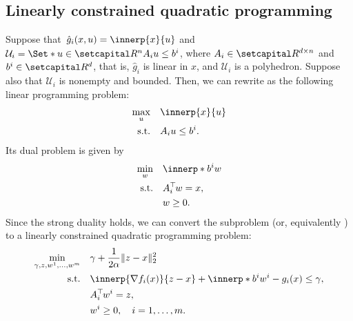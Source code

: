 \documentclass[../../main]{subfiles}
\begin{document}
\subsection{Linearly constrained quadratic programming} 
Suppose that~$\hat{g}_i (x,u) = \innerp{x}{u}$ and ${\mathcal{U}}_i = \Set*{ u \in \setR^n }{ A_i u \le b^i }$, where $A_i \in \setR^{d \times n}$ and $b^i \in \setR^d$, that is, $\hat{g}_i$ is linear in $x$, and $\mathcal{U}_i$ is a polyhedron. Suppose also that $\mathcal{U}_i$ is nonempty and bounded.
Then, we can rewrite  as the following linear programming problem:
\begin{align}\label{eq:lp}
\begin{aligned}
\max_u \quad   & \innerp{x}{u} \\ 
\st    \quad   & A_i u \le b^i.
\end{aligned}
\end{align}
Its dual problem is given by
\begin{align}
\begin{aligned}
\min_w \quad   & \innerp*{b^i}{w} \\ 
\st    \quad   & A_i^\T w = x, \\
&w \geq 0.
\end{aligned}
\end{align}
Since the strong duality holds, we can convert the subproblem  (or, equivalently ) to a linearly constrained quadratic programming problem:
\begin{align}\label{eq:qp}
\begin{aligned}
\min_{\gamma, z, w^1, \dots, w^m} \quad   &\gamma + \frac{1}{2 \alpha}\norm{z - x}_2^2  \\ 
\st    \quad   &\innerp{\nabla f_i(x)}{z - x} + \innerp*{b^i}{w^i} - g_i(x) \le \gamma, \\
& A_i^\T w^i = z, \\
&w^i \geq 0, \quad i = 1,\dots,m.
\end{aligned}
\end{align}
\end{document}
